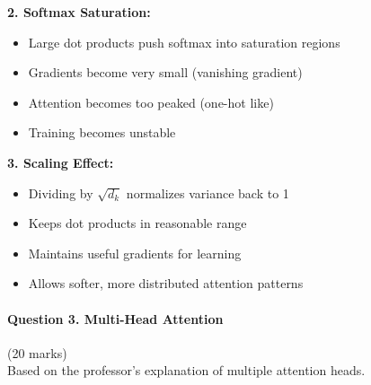 \documentclass[12pt]{article}
\begin{document}
\begin{enumerate}[(a)]
{    \textbf{2. Softmax Saturation:}
    \begin{itemize}
        \item Large dot products push softmax into saturation regions
        \item Gradients become very small (vanishing gradient)
        \item Attention becomes too peaked (one-hot like)
        \item Training becomes unstable
    \end{itemize}
    
    \textbf{3. Scaling Effect:}
    \begin{itemize}
        \item Dividing by $\sqrt{d_k}$ normalizes variance back to 1
        \item Keeps dot products in reasonable range
        \item Maintains useful gradients for learning
        \item Allows softer, more distributed attention patterns
    \end{itemize}
    }
\end{enumerate}

\newpage
\paragraph{Question 3. Multi-Head Attention}\hfill (20 marks)\\
Based on the professor's explanation of multiple attention heads.
\end{document}
